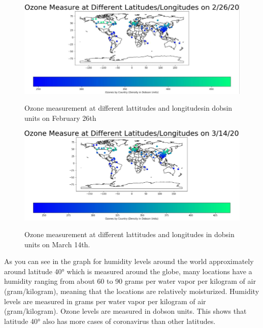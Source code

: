 \documentclass[10pt,journal,compsoc]{IEEEtran}
\begin{document}
{{\begin{figure}[!htbp] %
	\includegraphics[scale=0.3]{ozone-feb-26.png}\\ 
	\centering
	\caption{Ozone measurement at different lattitudes and longitudesin dobsin units on February 26th}
	\label{LP-COVID-Ozone February 26th}
\end{figure}

\begin{figure}[!htbp] %
	\includegraphics[scale=0.3]{ozone-mar-14.png}\\ 
	\centering
	\caption{Ozone measurement at different lattitudes and longitudes in dobsin units on March 14th.}
	\label{LP-COVID-Ozone March 14th}
\end{figure}

	As you can see in the graph for humidity levels around the world approximately around latitude 40° which is measured around the globe, many locations have a humidity ranging from about 60 to 90 grams per water vapor per kilogram of air (gram/kilogram), meaning that the locations are relatively moisturized. Humidity levels are measured in grams per water vapor per kilogram of air (gram/kilogram). Ozone levels are measured in dobson units. This shows that latitude 40° also has more cases of coronavirus than other latitudes.
\newline \newline

}}
\end{document}

